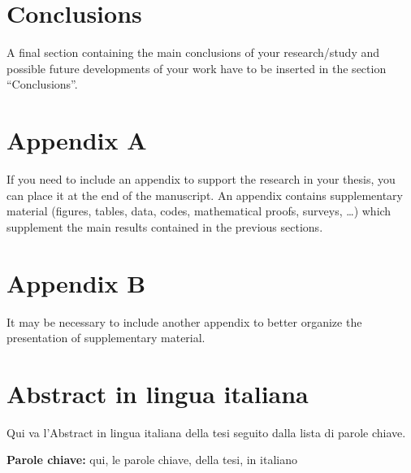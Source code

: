 \documentclass[11pt,a4paper]{article}
\begin{document}
\section{Conclusions}
\color{black}
A final section containing the main conclusions of your research/study
and possible future developments of your work have to be inserted in the section ``Conclusions''.


\nocite{*} %
\printbibliography

\appendix
\section{Appendix A}
If you need to include an appendix to support the research in your thesis, you can place it at the end of the manuscript.
An appendix contains supplementary material (figures, tables, data, codes, mathematical proofs, surveys, \dots)
which supplement the main results contained in the previous sections.

\section{Appendix B}
It may be necessary to include another appendix to better organize the presentation of supplementary material.

\cleardoublepage

\section*{Abstract in lingua italiana}
Qui va l'Abstract in lingua italiana della tesi seguito dalla lista di parole chiave.
\vspace{15pt}
\begin{tcolorbox}[arc=0pt, boxrule=0pt, colback=bluePoli!60, width=\textwidth, colupper=white]
    \textbf{Parole chiave:} qui, le parole chiave, della tesi, in italiano 
\end{tcolorbox}
\end{document}
